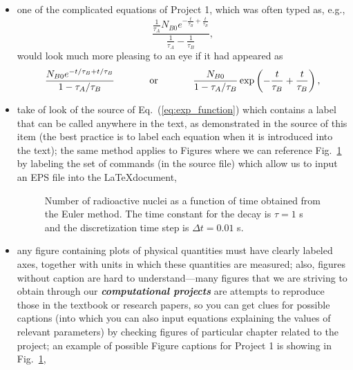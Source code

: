 \documentclass[12pt]{article}
\begin{document}
\begin{itemize}
\item one of the complicated equations of Project 1, which was often typed as, e.g.,
\begin{equation}
\frac{\frac{1}{\tau_A}N_{B0} e^{-\frac{t}{\tau_B}+\frac{t}{\tau_B}}}{\frac{1}{\tau_A}-\frac{1}{\tau_B}},
\end{equation}
would look much more pleasing to an eye if it had appeared as
\begin{equation}
\frac{N_{B0} e^{-t/\tau_B + t/\tau_B}}{1 - \tau_A/\tau_B} \hspace{0.5in} {\rm or} \hspace{0.5in} \frac{N_{B0}}{1 - \tau_A/\tau_B}  \exp \left(-\frac{t}{\tau_B} + \frac{t}{\tau_B} \right),
\end{equation}

\item take of look of the source of Eq.~(\ref{eq:exp_function}) which contains a  label that can be 
called anywhere in the text, as demonstrated in the source of this item (the best practice is to label 
each equation when it is introduced into the text); the same method applies to Figures where we 
can reference Fig.~\ref{fig:decay} by labeling the set of commands (in the source file) which allow us to input an  EPS file into the \LaTeX document,

\vspace{0.2in}

%
\begin{figure}[ht]
\caption{Number of radioactive nuclei as a function of time obtained from the Euler method. The time constant for the decay is $\tau=1$ s and the discretization time step is $\Delta t=0.01$ s. }\label{fig:decay}
\end{figure}
%


\item any figure containing plots of physical quantities must have clearly labeled axes, together with units in which these quantities are measured; also, figures without caption are hard to understand---many figures that we are striving to obtain through our {\bf \em computational projects} are attempts to reproduce those in the textbook or research papers, so you can get clues for possible captions (into which you can also input equations explaining the values of relevant parameters) by checking figures of particular chapter related to the project; an example of possible Figure captions for Project 1 is showing in Fig.~\ref{fig:decay},


\end{itemize}
\end{document}
